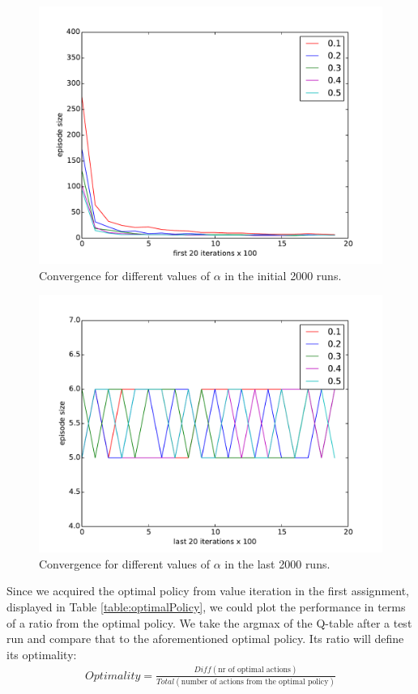 \documentclass[paper=a4, fontsize=11pt]{scrartcl}
\numberwithin{equation}{section}		%
\numberwithin{figure}{section}			%
\numberwithin{table}{section}				%
\begin{document}
\begin{figure}[H] \centering
\includegraphics[scale=0.5]{alphafirst20x100.pdf}
\caption{Convergence for different values of $\alpha$ in the initial 2000 runs.} 
\label{figure:alphafirst20}
\end{figure}
\begin{figure}[H] \centering
\includegraphics[scale=0.5]{alphalast20x100.pdf}
\caption{Convergence for different values of $\alpha$ in the last 2000 runs.} 
\label{figure:alphalast20}
\end{figure}
Since we acquired the optimal policy from value iteration in the first assignment, displayed in Table \ref{table:optimalPolicy}, we could plot the performance in terms of a ratio from the optimal policy. We take the argmax of the Q-table after a test run and compare that to the aforementioned optimal policy. Its ratio will define its optimality:
\begin{align}
Optimality = \frac{Diff(\text{nr of optimal actions})}{Total(\text{number of actions from the optimal policy})}
\end{align}
\end{document}
